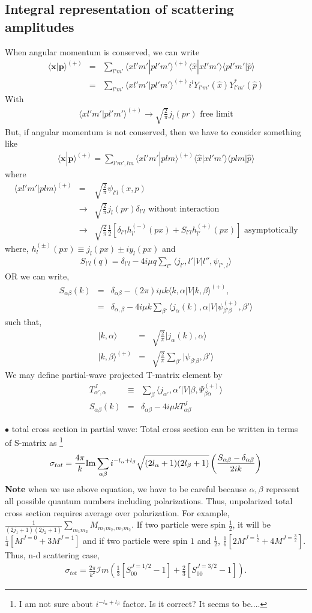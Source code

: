 \documentclass[10pt]{book}
\def\bm{\boldsymbol}
\newcommand{\bea}{\begin{eqnarray}}
\newcommand{\eea}{\end{eqnarray}}
\newcommand{\no}{\nonumber \\}
\def\vp{{\bm p}}
\def\vx{{\bm x}}
\def\la{\langle}
\def\ra{\rangle}
\begin{document}
\subsection{Integral representation of scattering amplitudes}
When angular momentum is conserved, we can write
\bea
\la \vx|\vp\ra^{(+)}&=&
\sum_{l' m'}\la x l' m' | pl'm'\ra^{(+)} \la\hat{x}|xl'm'\ra
                               \la p l'm' |\hat{p}\ra \no
&=&\sum_{l 'm '}\la x l' m' | pl'm'\ra^{(+)} i^l Y_{l' m'}(\hat{x})
                               Y^*_{l' m'}(\hat{p})   
\eea
With
\bea
\la x l' m' | pl'm'\ra^{(+)}\to \sqrt{\frac{2}{\pi}}j_l(pr)
\mbox{ free limit} 
\eea
But, if angular momentum is not conserved, then
we have to consider something like
\bea
\la \vx|\vp\ra^{(+)}
=\sum_{l'm', lm}\la x l' m'|p l m\ra^{(+)}
                 \la \hat{x}|x l' m'\ra \la p l m|\hat{p}\ra 
\eea
where
\bea
\la x l'm'|p l m\ra^{(+)} 
&=& \sqrt{\frac{2}{\pi}}\psi_{l'l}(x,p)
\no
&\to& \sqrt{\frac{2}{\pi}}j_l(pr)\delta_{l' l} 
 \mbox{ without interaction} \no
&\to& \sqrt{\frac{2}{\pi}}
      \frac{1}{2}[\delta_{l'l}h_{l'}^{(-)}(px)
                 +S_{l'l} h_{l'}^{(+)}(px)]
 \mbox{ asymptotically}                      
\eea
where, $h^{(\pm)}_l(px)\equiv j_l(px)\pm i y_l(px)$
and 
\bea
S_{l' l}(q)=\delta_{l'l}-4i\mu q\sum_{l''}
         \la j_{l'} , l'| V| l'', \psi_{l'',l}\ra  
\eea
OR we can write,
\bea
S_{\alpha\beta}(k)
&=&\delta_{\alpha\beta}-(2\pi)i \mu k 
        \la k,\alpha| V| k,\beta\ra^{(+)},\no
&=&\delta_{\alpha,\beta}-4 i \mu k \sum_{\beta'}
       \la j_{\alpha}(k),\alpha|V|\psi^{(+)}_{\beta'\beta},\beta'\ra
\eea
such that,
\bea
|k,\alpha\ra&=&\sqrt{\frac{2}{\pi}}|j_{\alpha}(k),\alpha\ra \no
|k,\beta\ra^{(+)}&=&\sqrt{\frac{2}{\pi}}
                    \sum_{\beta'}|\psi_{\beta'\beta},\beta'\ra
\eea
We may define partial-wave projected T-matrix element by
\bea
T^J_{\alpha',\alpha}&\equiv&\sum_{\beta} 
    \la j_{\alpha'},\alpha'|V|\beta,\Psi^{(+)}_{\beta\alpha}\ra\no
S_{\alpha\beta}(k)&=&\delta_{\alpha\beta}-4i\mu k T^J_{\alpha\beta}    
\eea

$\bullet$ total cross section in partial wave:
Total cross section can be written in terms of S-matrix as
\footnote{
I am not sure about $i^{-l_\alpha+l_\beta}$ factor.
Is it correct? It seems to be....
}
\bea
\sigma_{tot}=\frac{4\pi}{k}{\rm Im}\sum_{\alpha\beta}i^{-l_\alpha+l_\beta}\sqrt{(2l_\alpha+1)(2l_\beta+1)}
\left(\frac{S_{\alpha\beta}-\delta_{\alpha\beta}}{2i k}\right)
\eea
{\bf Note} when we use above equation,
we have to be careful because $\alpha,\beta$ represent
all possible quantum numbers including polarizations.
Thus, unpolarized total cross section requires average 
over polarization. 
For example, 
$\frac{1}{(2j_1+1)(2j_2+1)}\sum_{m_1 m_2} M_{m_1m_2,m_1m_2}$.
If two particle were spin $\frac{1}{2}$, it will be
$\frac{1}{4}[M^{J=0}+3 M^{J=1}]$ and if two particle were
spin $1$ and $\frac{1}{2}$,
$\frac{1}{6}[2 M^{J=\frac{1}{2}}+4 M^{J=\frac{3}{2}}]$.
Thus, n-d scattering case,
\bea
\sigma_{tot}=\frac{2\pi}{k^2}{\mathcal Im}(\frac{1}{3}[S^{J=1/2}_{00}-1]
+\frac{2}{3}[S^{J=3/2}_{00}-1]).
\eea 
\end{document}
